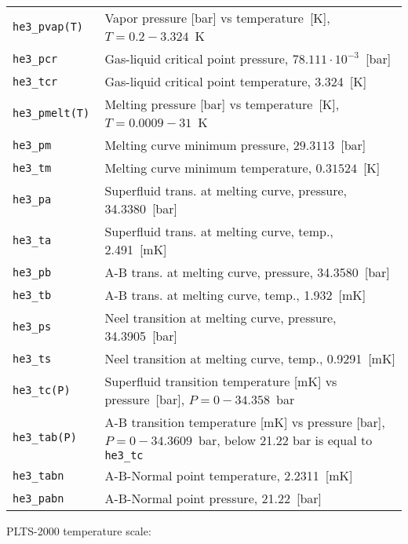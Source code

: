 \documentclass[a4paper]{article}
\begin{document}
\medskip
\noindent\begin{tabular}{lp{11cm}}
\tt he3\_pvap(T)  & Vapor pressure [bar] vs temperature~[K],\newline
                    $ T = 0.2 - 3.324$~K \\
\tt he3\_pcr      & Gas-liquid critical point pressure, $78.111\cdot 10^{-3}$~[bar] \\
\tt he3\_tcr      & Gas-liquid critical point temperature, 3.324~[K] \\
\tt he3\_pmelt(T) & Melting pressure [bar] vs temperature~[K],\newline
                    $ T = 0.0009 - 31$~K\\
\tt he3\_pm       & Melting curve minimum pressure, $29.3113$~[bar]\\
\tt he3\_tm       & Melting curve minimum temperature, $0.31524$~[K]\\
\tt he3\_pa       & Superfluid trans. at melting curve, pressure, 34.3380~[bar]\\
\tt he3\_ta       & Superfluid trans. at melting curve, temp., 2.491~[mK]\\
\tt he3\_pb       & A-B trans. at melting curve, pressure, 34.3580~[bar]\\
\tt he3\_tb       & A-B trans. at melting curve, temp., 1.932~[mK]\\
\tt he3\_ps       & Neel transition at melting curve, pressure, 34.3905~[bar]\\
\tt he3\_ts       & Neel transition at melting curve, temp., 0.9291~[mK]\\
\tt he3\_tc(P)    & Superfluid transition temperature [mK] vs pressure~[bar],\newline
                    $ P = 0 - 34.358 $~bar\\
\tt he3\_tab(P)   & A-B transition temperature [mK] vs pressure [bar],\newline
                    $ P = 0 - 34.3609 $~bar, below 21.22 bar is equal to {\tt he3\_tc}\\
\tt he3\_tabn     & A-B-Normal point temperature, 2.2311~[mK]\\
\tt he3\_pabn     & A-B-Normal point pressure, 21.22~[bar]\\
\end{tabular}
\medskip

PLTS-2000 temperature scale:
\end{document}
